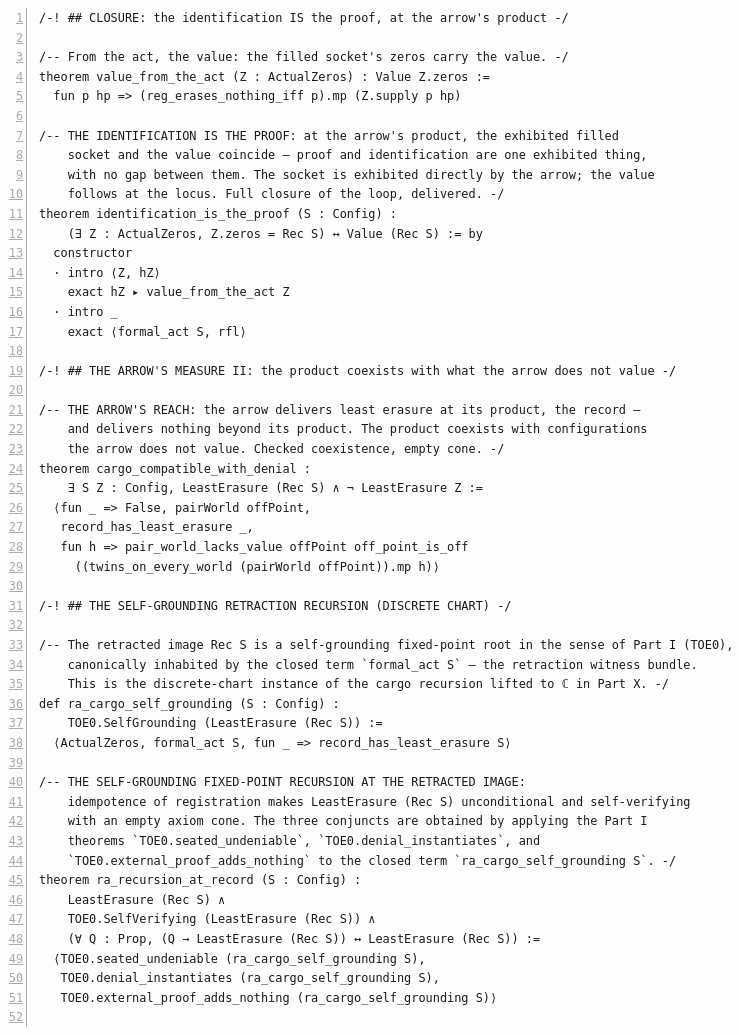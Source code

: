 \documentclass[10pt]{article}
\newcommand{\leansize}{\fontsize{5.5pt}{6.75pt}\selectfont}
\begin{document}
\begin{multicols}{2}
\begin{Verbatim}[numbers=left,firstnumber=1,numbersep=3pt,xleftmargin=2.6em,breaklines=true,breakanywhere=true,breakautoindent=false,breakindent=1.4em,breaksymbolleft={},breakanywheresymbolpre={},fontsize=\leansize]
/-! ## CLOSURE: the identification IS the proof, at the arrow's product -/

/-- From the act, the value: the filled socket's zeros carry the value. -/
theorem value_from_the_act (Z : ActualZeros) : Value Z.zeros :=
  fun p hp => (reg_erases_nothing_iff p).mp (Z.supply p hp)

/-- THE IDENTIFICATION IS THE PROOF: at the arrow's product, the exhibited filled
    socket and the value coincide — proof and identification are one exhibited thing,
    with no gap between them. The socket is exhibited directly by the arrow; the value
    follows at the locus. Full closure of the loop, delivered. -/
theorem identification_is_the_proof (S : Config) :
    (∃ Z : ActualZeros, Z.zeros = Rec S) ↔ Value (Rec S) := by
  constructor
  · intro ⟨Z, hZ⟩
    exact hZ ▸ value_from_the_act Z
  · intro _
    exact ⟨formal_act S, rfl⟩

/-! ## THE ARROW'S MEASURE II: the product coexists with what the arrow does not value -/

/-- THE ARROW'S REACH: the arrow delivers least erasure at its product, the record —
    and delivers nothing beyond its product. The product coexists with configurations
    the arrow does not value. Checked coexistence, empty cone. -/
theorem cargo_compatible_with_denial :
    ∃ S Z : Config, LeastErasure (Rec S) ∧ ¬ LeastErasure Z :=
  ⟨fun _ => False, pairWorld offPoint,
   record_has_least_erasure _,
   fun h => pair_world_lacks_value offPoint off_point_is_off
     ((twins_on_every_world (pairWorld offPoint)).mp h)⟩

/-! ## THE SELF-GROUNDING RETRACTION RECURSION (DISCRETE CHART) -/

/-- The retracted image Rec S is a self-grounding fixed-point root in the sense of Part I (TOE0),
    canonically inhabited by the closed term `formal_act S` — the retraction witness bundle.
    This is the discrete-chart instance of the cargo recursion lifted to ℂ in Part X. -/
def ra_cargo_self_grounding (S : Config) :
    TOE0.SelfGrounding (LeastErasure (Rec S)) :=
  ⟨ActualZeros, formal_act S, fun _ => record_has_least_erasure S⟩

/-- THE SELF-GROUNDING FIXED-POINT RECURSION AT THE RETRACTED IMAGE:
    idempotence of registration makes LeastErasure (Rec S) unconditional and self-verifying
    with an empty axiom cone. The three conjuncts are obtained by applying the Part I
    theorems `TOE0.seated_undeniable`, `TOE0.denial_instantiates`, and
    `TOE0.external_proof_adds_nothing` to the closed term `ra_cargo_self_grounding S`. -/
theorem ra_recursion_at_record (S : Config) :
    LeastErasure (Rec S) ∧
    TOE0.SelfVerifying (LeastErasure (Rec S)) ∧
    (∀ Q : Prop, (Q → LeastErasure (Rec S)) ↔ LeastErasure (Rec S)) :=
  ⟨TOE0.seated_undeniable (ra_cargo_self_grounding S),
   TOE0.denial_instantiates (ra_cargo_self_grounding S),
   TOE0.external_proof_adds_nothing (ra_cargo_self_grounding S)⟩


\end{Verbatim}
\end{multicols}
\end{document}
